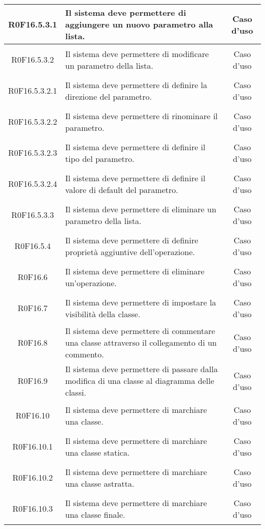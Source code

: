 \documentclass[../AnalisiDeiRequisiti.tex]{subfiles}
\begin{document}
\begin{longtable}{|c|>{\centering}p{7cm}|c|}
\hypertarget{R0F16.5.3.1}{R0F16.5.3.1} & Il sistema deve permettere di aggiungere un nuovo parametro alla lista. & Caso d'uso \\ \hline
\hypertarget{R0F16.5.3.2}{R0F16.5.3.2} & Il sistema deve permettere di modificare un parametro della lista. & Caso d'uso \\ \hline
\hypertarget{R0F16.5.3.2.1}{R0F16.5.3.2.1} & Il sistema deve permettere di definire la direzione del parametro. & Caso d'uso \\ \hline
\hypertarget{R0F16.5.3.2.2}{R0F16.5.3.2.2} & Il sistema deve permettere di rinominare il parametro. & Caso d'uso \\ \hline
\hypertarget{R0F16.5.3.2.3}{R0F16.5.3.2.3} & Il sistema deve permettere di definire il tipo del parametro. & Caso d'uso \\ \hline
\hypertarget{R0F16.5.3.2.4}{R0F16.5.3.2.4} & Il sistema deve permettere di definire il valore di default del parametro.  & Caso d'uso \\ \hline
\hypertarget{R0F16.5.3.3}{R0F16.5.3.3} & Il sistema deve permettere di eliminare un parametro della lista. & Caso d'uso \\ \hline
\hypertarget{R0F16.5.4}{R0F16.5.4} & Il sistema deve permettere di definire proprietà aggiuntive dell'operazione. & Caso d'uso \\ \hline
\hypertarget{R0F16.6}{R0F16.6} & Il sistema deve permettere di eliminare un'operazione.  & Caso d'uso \\ \hline
\hypertarget{R0F16.7}{R0F16.7} & Il sistema deve permettere di impostare la visibilità della classe. & Caso d'uso \\ \hline
\hypertarget{R0F16.8}{R0F16.8} & Il sistema deve permettere di commentare una classe attraverso il collegamento di un commento. & Caso d'uso \\ \hline
\hypertarget{R0F16.9}{R0F16.9} & Il sistema deve permettere di passare dalla modifica di una classe al diagramma delle classi. & Caso d'uso \\ \hline
\hypertarget{R0F16.10}{R0F16.10} & Il sistema deve permettere di marchiare una classe. & Caso d'uso \\ \hline
\hypertarget{R0F16.10.1}{R0F16.10.1} & Il sistema deve permettere di marchiare una classe statica. & Caso d'uso \\ \hline
\hypertarget{R0F16.10.2}{R0F16.10.2} & Il sistema deve permettere di marchiare una classe astratta. & Caso d'uso \\ \hline
\hypertarget{R0F16.10.3}{R0F16.10.3} & Il sistema deve permettere di marchiare una classe finale. & Caso d'uso \\ \hline

\end{longtable}
\end{document}
